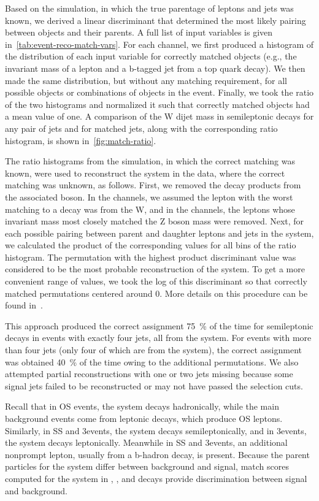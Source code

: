 Based on the \ttbar simulation, in which the true parentage of leptons and jets
was known, we derived a linear discriminant that determined the most likely
pairing between objects and their parents. A full list of input variables is
given in~\cref{tab:event-reco-match-vars}. For each channel, we first produced a
histogram of the distribution of each input variable for correctly matched
objects (e.g., the invariant mass of a lepton and a b-tagged jet from a top
quark decay). We then made the same distribution, but without any matching
requirement, for all possible objects or combinations of objects in the event.
Finally, we took the ratio of the two histograms and normalized it such that
correctly matched objects had a mean value of one. A comparison of the W dijet
mass in semileptonic \ttbar decays for any pair of jets and for matched jets,
along with the corresponding ratio histogram, is shown
in~\cref{fig:match-ratio}.

The ratio histograms from the simulation, in which the correct matching was
known, were used to reconstruct the \ttbar system in the data, where the correct
matching was unknown, as follows. First, we removed the decay products from the
associated boson. In the \ttW channels, we assumed the lepton with the worst
matching to a \ttbar decay was from the W, and in the \ttZ channels, the leptons
whose invariant mass most closely matched the Z boson mass were removed. Next,
for each possible pairing between parent and daughter leptons and jets in the
\ttbar system, we calculated the product of the corresponding values for all bins
of the ratio histogram. The permutation with the highest product discriminant
value was considered to be the most probable reconstruction of the \ttbar system.
To get a more convenient range of values, we took the log of this discriminant
so that correctly matched permutations centered around 0. More details on this
procedure can be found in~\cite{brinkerhoff-thesis}.

This approach produced the correct assignment \SI{75}{\percent} of the time for
semileptonic \ttbar decays in events with exactly four jets, all from the \ttbar
system. For events with more than four jets (only four of which are from the
\ttbar system), the correct assignment was obtained \SI{40}{\percent} of the
time owing to the additional permutations. We also attempted partial
reconstructions with one or two jets missing because some signal jets failed to
be reconstructed or may not have passed the selection cuts.

Recall that in OS \ttZ events, the \ttbar system decays hadronically, while the
main background events come from leptonic \ttbar decays, which produce OS
leptons. Similarly, in SS \ttW and 3\lep \ttZ events, the \ttbar system decays
semileptonically, and in 3\lep \ttW events, the \ttbar system decays
leptonically. Meanwhile in SS and 3\lep \ttbar events, an additional nonprompt
lepton, usually from a b-hadron decay, is present. Because the parent particles
for the \ttbar system differ between background and signal, match scores
computed for the \ttbar system in \ttW, \ttZ, and \ttbar decays provide
discrimination between signal and background.

